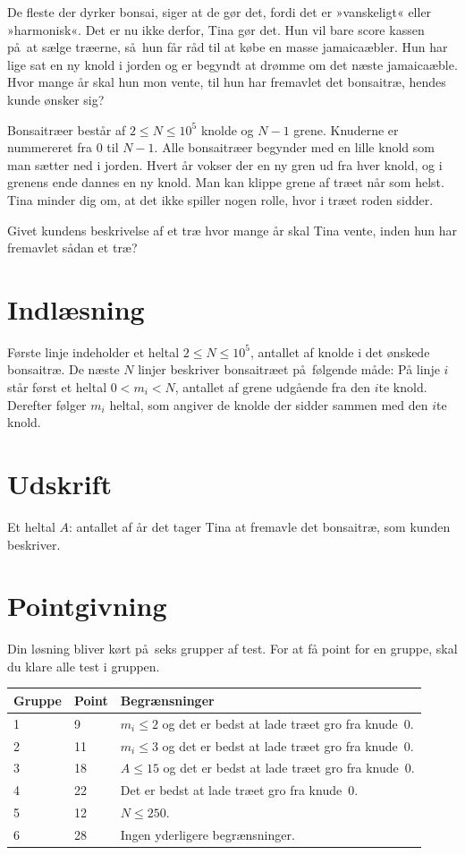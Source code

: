 
De fleste der dyrker bonsai, siger at de gør det, fordi det er »vanskeligt« eller »harmonisk«.
Det er nu ikke derfor, Tina gør det.
Hun vil bare score kassen på at sælge træerne, så hun får råd til at købe en masse jamaicaæbler.
Hun har lige sat en ny knold i jorden og er begyndt at drømme om det næste jamaicaæble.
Hvor mange år skal hun mon vente, til hun har fremavlet det bonsaitræ, hendes kunde ønsker sig?

Bonsaitræer består af $2\leq N \leq 10^5$ knolde og $N-1$ grene.
Knuderne er nummereret fra $0$ til $N-1$. 
Alle bonsaitræer begynder med en lille knold som man sætter ned i jorden.
Hvert år vokser der en ny gren ud fra hver knold, og i grenens ende dannes en ny knold.
Man kan klippe grene af træet når som helst. 
Tina minder dig om, at det ikke spiller nogen rolle, hvor i træet roden sidder.

Givet kundens beskrivelse af et træ hvor mange år skal Tina vente, inden hun har fremavlet sådan et træ?

\section*{Indlæsning}

Første linje indeholder et heltal $2\leq N\leq 10^5$, antallet af knolde i det ønskede bonsaitræ.
De næste $N$ linjer beskriver bonsaitræet på følgende måde:
På linje $i$ står først et heltal $0 < m_i < N$, antallet af grene udgående fra den $i$te knold. 
Derefter følger $m_i$ heltal, som angiver de knolde der sidder sammen med den $i$te knold.

\section*{Udskrift}

Et heltal $A$: antallet af år det tager Tina at fremavle det bonsaitræ, som kunden beskriver.

\section*{Pointgivning}

Din løsning bliver kørt på seks grupper af test.
For at få point for en gruppe, skal du klare alle test i gruppen. 

\meskip\noindent
\begin{tabular}{ l  l  l }
Gruppe & Point      & Begrænsninger \\ \hline
1      &  9         & $m_i\leq 2$ og det er bedst at lade træet gro fra knude~0.\\ 
2      & 11         & $m_i \leq 3$ og det er bedst at lade træet gro fra knude~0. \\ 
3      & 18         & $A \leq 15$ og det er bedst at lade træet gro fra knude~0. \\ 
4      & 22         & Det er bedst at lade træet gro fra knude~0. \\ 
5      & 12         & $N \leq 250$. \\
6      & 28         & Ingen yderligere begrænsninger. 
\end{tabular}


